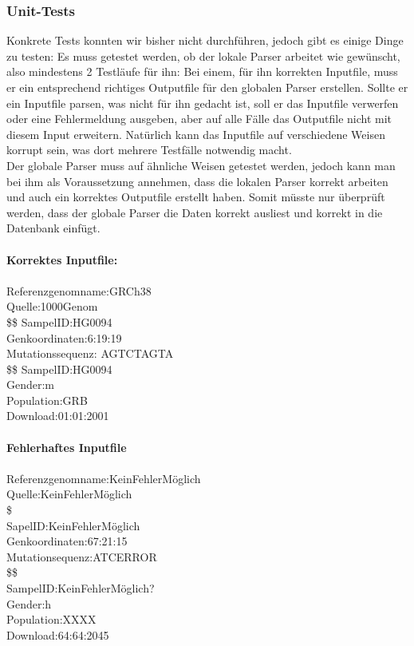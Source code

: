 \documentclass{scrartcl}
\begin{document}
\subsubsection{Unit-Tests}
Konkrete Tests konnten wir bisher nicht durchführen, jedoch gibt es einige Dinge zu testen: Es muss getestet werden, ob der lokale Parser arbeitet wie gewünscht, also mindestens 2 Testläufe für ihn: Bei einem, für ihn korrekten Inputfile, muss er ein entsprechend richtiges Outputfile für den globalen Parser erstellen. Sollte er ein Inputfile parsen, was nicht für ihn gedacht ist, soll er das Inputfile verwerfen oder eine Fehlermeldung ausgeben, aber auf alle Fälle das Outputfile nicht mit diesem Input erweitern. Natürlich kann das Inputfile auf verschiedene Weisen korrupt sein, was dort mehrere Testfälle notwendig macht.\\
Der globale Parser muss auf ähnliche Weisen getestet werden, jedoch kann man bei ihm als Voraussetzung annehmen, dass die lokalen Parser korrekt arbeiten und auch ein korrektes Outputfile erstellt haben. Somit müsste nur überprüft werden, dass der globale Parser die Daten korrekt ausliest und korrekt in die Datenbank einfügt.\\
\\
\textbf{Korrektes Inputfile:}\\
\\
Referenzgenomname:GRCh38\\
Quelle:1000Genom\\
\$\$
SampelID:HG0094\\
Genkoordinaten:6:19:19\\
Mutationssequenz: AGTCTAGTA\\
\$\$
SampelID:HG0094\\
Gender:m\\
Population:GRB\\
Download:01:01:2001\\
\\
\textbf{Fehlerhaftes Inputfile}\\
\\
Referenzgenomname:KeinFehlerMöglich\\
Quelle:KeinFehlerMöglich\\
\$\\
SapelID:KeinFehlerMöglich\\
Genkoordinaten:67:21:15\\
Mutationsequenz:ATCERROR\\
\$\$\\
SampelID:KeinFehlerMöglich?\\
Gender:h\\
Population:XXXX\\
Download:64:64:2045\\
\end{document}
